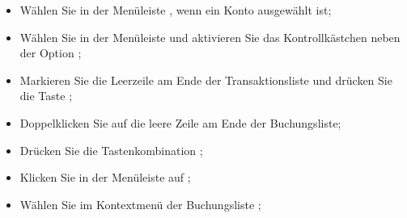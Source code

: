 \begin{itemize}
	\item Wählen Sie in der Menüleiste , wenn ein Konto ausgewählt ist;
	\item Wählen Sie in der Menüleiste  und aktivieren Sie das Kontrollkästchen neben der Option ;
	\item Markieren Sie die Leerzeile am Ende der Transaktionsliste und drücken Sie die Taste ;
	\item Doppelklicken Sie auf die leere Zeile am Ende der Buchungsliste;
	\item Drücken Sie die Tastenkombination ;
	\item Klicken Sie in der Menüleiste auf ;
	\item Wählen Sie im Kontextmenü der Buchungsliste ;

\end{itemize}
